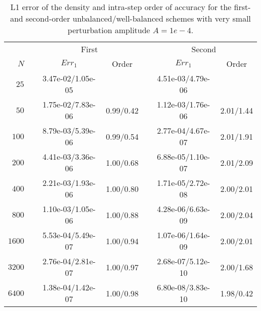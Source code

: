 \begin{table*}\centering
\caption{L1 error of the density and intra-step order of accuracy for the first- and second-order unbalanced/well-balanced schemes with very small perturbation amplitude $A=1e-4$.}
\label{table:OVS_Asmall}
\begin{tabular}{@{}rcccccc@{}}\toprule
& \phantom{a} & \multicolumn{2}{c}{First} & \phantom{ab} & \multicolumn{2}{c}{Second}\\
\cmidrule{3-4} \cmidrule{6-7}
$N$ && $Err_1$ & Order && $Err_1$ & Order\\ \midrule
$25$ && 3.47e-02/1.05e-05 &&& 4.51e-03/4.79e-06 &\\
$50$ && 1.75e-02/7.83e-06 & 0.99/0.42 && 1.12e-03/1.76e-06 & 2.01/1.44\\
$100$ && 8.79e-03/5.39e-06 & 0.99/0.54 && 2.77e-04/4.67e-07 & 2.01/1.91\\
$200$ && 4.41e-03/3.36e-06 & 1.00/0.68 && 6.88e-05/1.10e-07 & 2.01/2.09\\
$400$ && 2.21e-03/1.93e-06 & 1.00/0.80 && 1.71e-05/2.72e-08 & 2.00/2.01\\
$800$ && 1.10e-03/1.05e-06 & 1.00/0.88 && 4.28e-06/6.63e-09 & 2.00/2.04\\
$1600$ && 5.53e-04/5.49e-07 & 1.00/0.94 && 1.07e-06/1.64e-09 & 2.00/2.01\\
$3200$ && 2.76e-04/2.81e-07 & 1.00/0.97 && 2.68e-07/5.12e-10 & 2.00/1.68\\
$6400$ && 1.38e-04/1.42e-07 & 1.00/0.98 && 6.80e-08/3.83e-10 & 1.98/0.42\\
\bottomrule
\end{tabular}
\end{table*}


